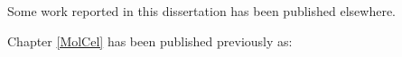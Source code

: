 \prefaceSection{}

Some work reported in this dissertation has been published elsewhere.


Chapter \ref{MolCel} has been published previously as:

  \begin{quote}
    \itshape 
    \singlespacing
    \end{quote}

\clearpage